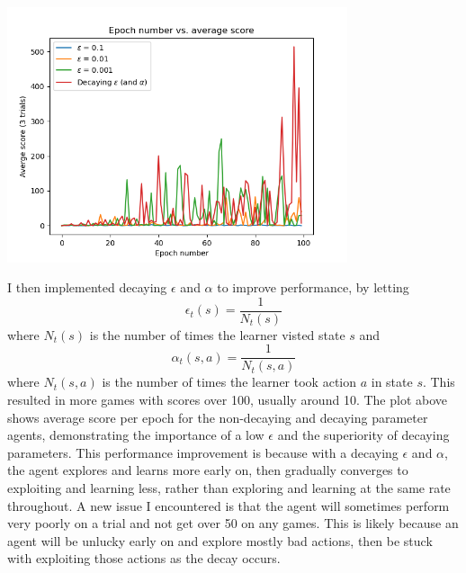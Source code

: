 \documentclass[submit]{harvardml}
\begin{document}

\begin{center}
	\includegraphics[width=0.75\textwidth]{T6_P3/q_learning_epsilon_scores}
\end{center}

I then implemented decaying $\epsilon$ and $\alpha$ to improve performance, by letting
$$\epsilon_t(s) = \frac{1}{N_t(s)}$$
where $N_t(s)$ is the number of times the learner visted state $s$ and
$$\alpha_t(s, a) = \frac{1}{N_t(s, a)}$$
where $N_t(s, a)$ is the number of times the learner took action $a$ in state $s$. This resulted in more games with scores over 100, usually around 10.
The plot above shows average score per epoch for the non-decaying and decaying parameter agents, demonstrating the importance of a low $\epsilon$ and the superiority of decaying parameters.
This performance improvement is because with a decaying $\epsilon$ and $\alpha$, the agent explores and learns more early on, then gradually converges to exploiting and learning less, rather than exploring and learning at the same rate throughout. A new issue I encountered is that the agent will sometimes perform very poorly on a trial and not get over 50 on any games. This is likely because an agent will be unlucky early on and explore mostly bad actions, then be stuck with exploiting those actions as the decay occurs.
\end{document}
